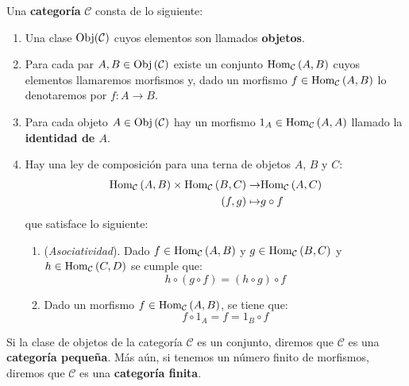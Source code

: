 \documentclass[12pt]{report}
\theoremstyle{largebreak}
\newcommand\cf[3]{\ensuremath{#1:#2\rightarrow#3}}
\newcommand{\Obj}[1]{\ensuremath{\textup{Obj}\left(#1\right)}}
\newcommand{\Hom}[3]{\ensuremath{\textup{Hom}_{#1}\left(#2,#3\right)}}
\begin{document}
    \begin{mydef}
        Una \textbf{categoría} $\mathcal{C}$ consta de lo siguiente:
        \begin{enumerate}
            \item Una clase $\textup{Obj}(\mathcal{C})$ cuyos elementos son llamados \textbf{objetos}.
            \item Para cada par $A,B\in\Obj{\mathcal{C}}$ existe un conjunto $\Hom{\mathcal{C}}{A}{B}$ cuyos elementos llamaremos morfismos y, dado un morfismo $f\in\Hom{\mathcal{C}}{A}{B}$ lo denotaremos por $\cf{f}{A}{B}$.
            \item Para cada objeto $A\in\Obj{\mathcal{C}}$ hay un morfismo $1_A\in\Hom{\mathcal{C}}{A}{A}$ llamado la \textbf{identidad de $A$}.
            \item Hay una ley de composición para una terna de objetos $A$, $B$ y $C$:
            \begin{equation*}
                \begin{split}
                    \Hom{\mathcal{C}}{A}{B}\times\Hom{\mathcal{C}}{B}{C}\rightarrow&\Hom{\mathcal{C}}{A}{C}\\
                    (f,g)\mapsto&g\circ f\\
                \end{split}
            \end{equation*}
            que satisface lo siguiente:
            \begin{enumerate}
                \item (\textit{Asociatividad}). Dado $f\in\Hom{\mathcal{C}}{A}{B}$ y $g\in\Hom{\mathcal{C}}{B}{C}$ y $h\in\Hom{\mathcal{C}}{C}{D}$ se cumple que:
                \begin{equation*}
                    h\circ (g\circ f)=(h\circ g)\circ f
                \end{equation*}
                \item Dado un morfismo $f\in\Hom{\mathcal{C}}{A}{B}$, se tiene que:
                \begin{equation*}
                    f\circ 1_A=f=1_B\circ f
                \end{equation*}
            \end{enumerate}
        \end{enumerate}
    \end{mydef}

    \begin{mydef}
        Si la clase de objetos de la categoría $\mathcal{C}$ es un conjunto, diremos que $\mathcal{C}$ es una \textbf{categoría pequeña}. Más aún, si tenemos un número finito de morfismos, diremos que $\mathcal{C}$ es una \textbf{categoría finita}.
    \end{mydef}
\end{document}
